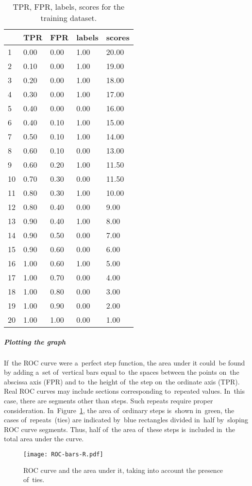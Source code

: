 \documentclass[]{scrreprt}
\begin{document}
\begin{table}[ht]
	\caption{TPR, FPR, labels, scores for the training dataset.}\label{tab:roc_df-r}
	\centering
	\begin{tabular}{lllll}
		\hline
		& TPR & FPR & labels & scores \\ 
		\hline
		1 & 0.00 & 0.00 & 1.00 & 20.00 \\ 
		2 & 0.10 & 0.00 & 1.00 & 19.00 \\ 
		3 & 0.20 & 0.00 & 1.00 & 18.00 \\ 
		4 & 0.30 & 0.00 & 1.00 & 17.00 \\ 
		5 & 0.40 & 0.00 & 0.00 & 16.00 \\ 
		6 & 0.40 & 0.10 & 1.00 & 15.00 \\ 
		7 & 0.50 & 0.10 & 1.00 & 14.00 \\ 
		8 & 0.60 & 0.10 & 0.00 & 13.00 \\ 
		9 & 0.60 & 0.20 & 1.00 & 11.50 \\ 
		10 & 0.70 & 0.30 & 0.00 & 11.50 \\ 
		11 & 0.80 & 0.30 & 1.00 & 10.00 \\ 
		12 & 0.80 & 0.40 & 0.00 & 9.00 \\ 
		13 & 0.90 & 0.40 & 1.00 & 8.00 \\ 
		14 & 0.90 & 0.50 & 0.00 & 7.00 \\ 
		15 & 0.90 & 0.60 & 0.00 & 6.00 \\ 
		16 & 1.00 & 0.60 & 1.00 & 5.00 \\ 
		17 & 1.00 & 0.70 & 0.00 & 4.00 \\ 
		18 & 1.00 & 0.80 & 0.00 & 3.00 \\ 
		19 & 1.00 & 0.90 & 0.00 & 2.00 \\ 
		20 & 1.00 & 1.00 & 0.00 & 1.00 \\ 
		\hline
	\end{tabular}
\end{table}
%
\subparagraph{Plotting the graph}
If~the ROC curve were a~perfect step function, the area under it could~be found by adding a~set of~vertical bars equal to~the spaces between the points on~the abscissa axis (FPR) and to~the height of~the step on~the ordinate axis (TPR). Real ROC curves may include sections corresponding to~repeated values. In~this case, there are segments other than steps. Such repeats require proper consideration. In~Figure~\ref{fig:ROC-bars-R}, the area of~ordinary steps is~shown in~green, the cases of~repeats~(ties) are indicated by~blue rectangles divided in~half by~sloping ROC curve segments. Thus, half of~the area of~these steps is~included in~the total area under the curve.
%
\begin{figure}[ht]
	\centering
	\texttt{[image: ROC-bars-R.pdf]}
	\caption{ROC curve and the area under it, taking into account the presence of~ties.}
	\label{fig:ROC-bars-R}
\end{figure}
\end{document}
